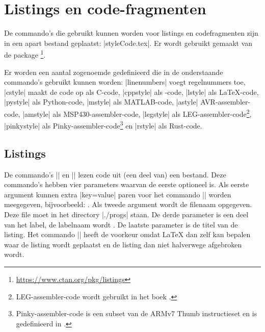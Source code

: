 \chapter{Listings en code-fragmenten}
\label{sec:listings}
De commando's die gebruikt kunnen worden voor listings en codefragmenten zijn in een apart bestand geplaatst: |styleCode.tex|.
Er wordt gebruikt gemaakt van de package \footnote{\url{https://www.ctan.org/pkg/listings}}.

Er worden een aantal zogenoemde  gedefinieerd die in de onderstaande commando's gebruikt kunnen worden: |linenumbers| voegt regelnummers toe, |cstyle| maakt de code op als C-code, |cppstyle| als \Cpp{}-code, |lstyle| als \LaTeX\hyp{}code, |pystyle| als Python\hyp{}code, |mstyle| als MATLAB-code, |astyle| AVR\hyp{}assembler\hyp{}code, |amstyle| als MSP430\hyp{}assembler\hyp{}code, |legstyle| als LEG\hyp{}assembler\hyp{}code\footnote{%
    LEG\hyp{}assembler\hyp{}code wordt gebruikt in het boek  \cite{Patterson2016}.
}, |pinkystyle| als Pinky\hyp{}assembler\hyp{}code\footnote{%
    Pinky\hyp{}assembler\hyp{}code is een subset van de ARMv7 Thumb instructieset en is gedefinieerd in \cite{Broeders2022}.
} en |rstyle| als Rust\hyp{}code.

\section{Listings}
\label{sec:lstcommands}
De commando's |\floatlstinput| en |\lstinput| lezen code uit (een deel van) een bestand.
Deze commando's hebben vier parameters waarvan de eerste optioneel is.
Als eerste argument kunnen extra |key=value| paren voor het commando || worden meegegeven, bijvoorbeeld: .
Als tweede argument wordt de filenaam opgegeven.
Deze file moet in het directory |./progs| staan.
De derde parameter is een deel van het label, de labelnaam wordt {\lstllabel{}}.
De laatste parameter is de titel van de listing.
Het commando |\floatlstinput| heeft de voorkeur omdat \LaTeX{} dan zelf kan bepalen waar de listing wordt geplaatst en de listing dan niet halverwege afgebroken wordt.

